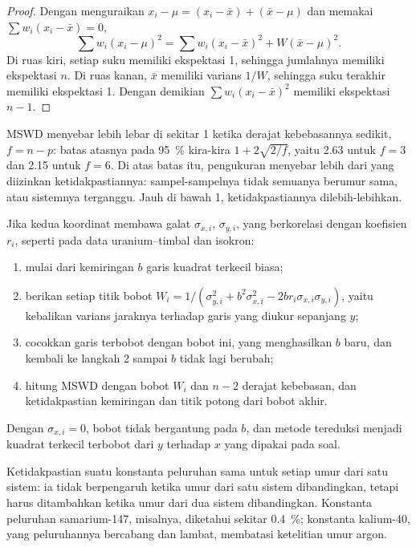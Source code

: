 \begin{proof}
Dengan menguraikan $x_i - \mu = (x_i - \bar x) + (\bar x - \mu)$ dan memakai $\sum
w_i(x_i - \bar x) = 0$,
\[
\sum w_i(x_i - \mu)^2 = \sum w_i(x_i - \bar x)^2 + W(\bar x - \mu)^2.
\]
Di ruas kiri, setiap suku memiliki ekspektasi 1, sehingga jumlahnya memiliki ekspektasi $n$. Di
ruas kanan, $\bar x$ memiliki varians $1/W$, sehingga suku terakhir memiliki ekspektasi 1.
Dengan demikian $\sum w_i(x_i - \bar x)^2$ memiliki ekspektasi $n - 1$.
\end{proof}

MSWD menyebar lebih lebar di sekitar 1 ketika derajat kebebasannya sedikit,
$f = n - p$: batas atasnya pada \qty{95}{\percent} kira-kira $1 +
2\sqrt{2/f}$, yaitu 2.63 untuk $f = 3$ dan 2.15 untuk $f = 6$. Di atas batas itu,
pengukuran menyebar lebih dari yang diizinkan ketidakpastiannya: sampel-sampelnya tidak
semuanya berumur sama, atau sistemnya terganggu. Jauh di bawah 1, ketidakpastiannya
dilebih-lebihkan.

\begin{method}\label{met:b3:advanced-geochronology:york}
Jika kedua koordinat membawa galat $\sigma_{x,i}$, $\sigma_{y,i}$, yang berkorelasi
dengan koefisien $r_i$, seperti pada data uranium--timbal dan isokron:
\begin{enumerate}
\item mulai dari kemiringan $b$ garis kuadrat terkecil biasa;
\item berikan setiap titik bobot $W_i = 1/(\sigma_{y,i}^2 + b^2\sigma_{x,i}^2 -
2br_i\sigma_{x,i}\sigma_{y,i})$, yaitu kebalikan varians jaraknya terhadap
garis yang diukur sepanjang $y$;
\item cocokkan garis terbobot dengan bobot ini, yang menghasilkan $b$ baru, dan
kembali ke langkah 2 sampai $b$ tidak lagi berubah;
\item hitung MSWD dengan bobot $W_i$ dan $n - 2$ derajat kebebasan,
dan ketidakpastian kemiringan dan titik potong dari bobot akhir.
\end{enumerate}
Dengan $\sigma_{x,i} = 0$, bobot tidak bergantung pada $b$, dan metode
tereduksi menjadi kuadrat terkecil terbobot dari $y$ terhadap $x$ yang dipakai pada soal.
\end{method}

Ketidakpastian suatu konstanta peluruhan sama untuk setiap umur dari satu sistem:
ia tidak berpengaruh ketika umur dari satu sistem dibandingkan, tetapi harus ditambahkan
ketika umur dari dua sistem dibandingkan. Konstanta peluruhan samarium-147, misalnya,
diketahui sekitar \qty{0.4}{\percent}; konstanta kalium-40,
yang peluruhannya bercabang dan lambat, membatasi ketelitian umur argon.


